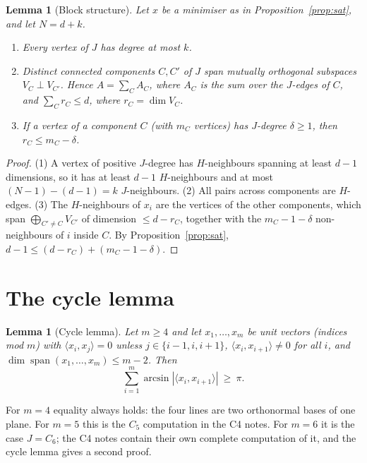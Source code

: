 \documentclass[11pt]{article}
\newtheorem{lemma}[theorem]{Lemma}
\theoremstyle{remark}
\begin{document}
\begin{lemma}[Block structure]\label{lem:blocks}
Let $x$ be a minimiser as in Proposition~\ref{prop:sat}, and let $N=d+k$.
\begin{enumerate}
\item Every vertex of $J$ has degree at most $k$.
\item Distinct connected components $C,C'$ of $J$ span mutually
orthogonal subspaces $V_C\perp V_{C'}$. Hence
$A=\sum_C A_C$, where $A_C$ is the sum over the $J$-edges of $C$, and
$\sum_C r_C\le d$, where $r_C=\dim V_C$.
\item If a vertex of a component $C$ (with $m_C$ vertices) has
$J$-degree $\delta\ge1$, then $r_C\le m_C-\delta$.
\end{enumerate}
\end{lemma}
\begin{proof}
(1) A vertex of positive $J$-degree has $H$-neighbours spanning at least
$d-1$ dimensions, so it has at least $d-1$ $H$-neighbours and at most
$(N-1)-(d-1)=k$ $J$-neighbours. (2) All pairs across components are
$H$-edges. (3) The $H$-neighbours of $x_i$ are the vertices of the other
components, which span $\bigoplus_{C'\ne C}V_{C'}$ of dimension
$\le d-r_C$, together with the $m_C-1-\delta$ non-neighbours of $i$
inside $C$. By Proposition~\ref{prop:sat},
$d-1\le (d-r_C)+(m_C-1-\delta)$.
\end{proof}

\section{The cycle lemma}

\begin{lemma}[Cycle lemma]\label{lem:cycle}
Let $m\ge4$ and let $x_1,\dots,x_m$ be unit vectors (indices mod $m$)
with $\langle x_i,x_j\rangle=0$ unless $j\in\{i-1,i,i+1\}$,
$\langle x_i,x_{i+1}\rangle\ne0$ for all $i$, and
$\dim\operatorname{span}(x_1,\dots,x_m)\le m-2$. Then
\[
\sum_{i=1}^m\arcsin|\langle x_i,x_{i+1}\rangle|\ \ge\ \pi.
\]
\end{lemma}

For $m=4$ equality always holds: the four lines are two orthonormal
bases of one plane. For $m=5$ this is the $C_5$ computation in the C4 notes.
For $m=6$ it is the case $J=C_6$; the C4 notes contain their own complete computation
of it, and the cycle lemma gives a second proof.
\end{document}
